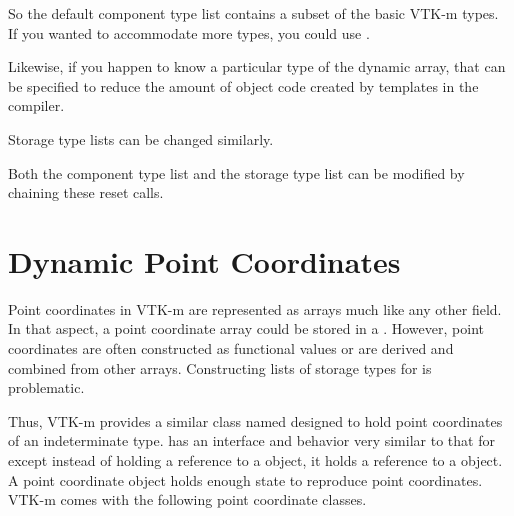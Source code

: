 So the default component type list contains a subset of the basic VTK-m
types. If you wanted to accommodate more types, you could use
.


Likewise, if you happen to know a particular type of the dynamic array,
that can be specified to reduce the amount of object code created by
templates in the compiler.


Storage type lists can be changed similarly.


Both the component type list and the storage type list can be modified by
chaining these reset calls.




\section{Dynamic Point Coordinates}
\label{sec:DynamicPointCoordinates}


Point coordinates in VTK-m are represented as arrays much like any other
field. In that aspect, a point coordinate array could be stored in a
. However, point coordinates are often
constructed as functional values or are derived and combined from other
arrays. Constructing lists of storage types for
 is problematic.

Thus, VTK-m provides a similar class named
 designed to hold point coordinates of an
indeterminate type.  has an
interface and behavior very similar to that for
 except instead of holding a reference
to a  object, it holds a reference to a
 object. A point coordinate object holds enough
state to reproduce point coordinates. VTK-m comes with the following point
coordinate classes.

